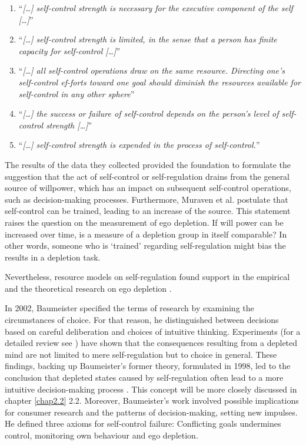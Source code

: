 \begin{enumerate} [1.]
\item “\emph{[\ldots] self-control strength is necessary for the executive component of the self [\ldots]}” \citep[p.~248]{muraven2000self}
\item “\emph{[\ldots] self-control strength is limited, in the sense that a person has finite capacity for self-control [\ldots]}” \citep[p.~248]{muraven2000self}
\item “\emph{[\ldots] all self-control operations draw on the same resource. Directing one's self-control ef-forts toward one goal should diminish the resources available for self-control in any other sphere}” \citep[p.~248]{muraven2000self}
\item “\emph{[\ldots] the success or failure of self-control depends on the person's level of self-control strength [\ldots]}” \citep[p.~248]{muraven2000self}
\item “\emph{[\ldots] self-control strength is expended in the process of self-control.}” \citep[p.~248]{muraven2000self}
\end{enumerate}
The results of the data they collected provided the foundation to formulate the suggestion that the act of self-control or self-regulation drains from the general source of willpower, which has an impact on subsequent self-control operations, such as decision-making processes. Furthermore, Muraven et al. postulate that self-control can be trained, leading to an increase of the source. This statement raises the question on the measurement of ego depletion. If will power can be increased over time, is a measure of a depletion group in itself comparable? In other words, someone who is ‘trained’ regarding self-regulation might bias the results in a depletion task.\par
Nevertheless, resource models on self-regulation found support in the empirical and the theoretical research on ego depletion \citep{mischel1996good,gross1998emerging,vohs2000self} .\par
In 2002, Baumeister \citep{baumeister2002yielding}  specified the terms of research by examining the circumstances of choice. For that reason, he distinguished between decisions based on careful deliberation and choices of intuitive thinking. Experiments (for a detailed review see \cite{vohs2000self}) have shown that the consequences resulting from a depleted mind are not limited to mere self-regulation but to choice in general. These findings, backing up Baumeister’s former theory, formulated in 1998, led to the conclusion that depleted states caused by self-regulation often lead to a more intuitive decision-making process \citep{pocheptsova2009deciding}. This concept will be more closely discussed in chapter \ref{chap2.2} 2.2. Moreover, Baumeister’s work involved possible implications for consumer research and the patterns of decision-making, setting new impulses. He defined three axioms for self-control failure: Conflicting goals undermines control, monitoring own behaviour and ego depletion. \par

